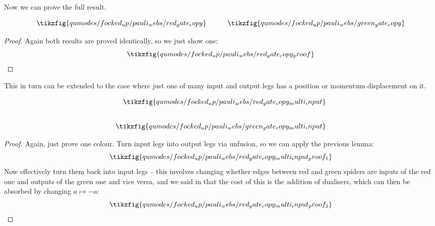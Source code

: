 
Now we can prove the full result.

\begin{proposition}\label{prop:gate_copy}
\begin{equation*}\label{eq:gate_copy}
    \tikzfig{qumodes/focked_up/pauli_webs/red_gate_copy}
    \qqquad
    \tikzfig{qumodes/focked_up/pauli_webs/green_gate_copy}
\end{equation*}
\begin{proof}
    Again both results are proved identically, so we just show one:
    \begin{equation*}\label{eq:red_gate_copy_proof}
    \tikzfig{qumodes/focked_up/pauli_webs/red_gate_copy_proof}
    \end{equation*}
\end{proof}
\end{proposition}

This in turn can be extended to the case where just one of many input and output legs has a position or momentum displacement on it.
\begin{lemma}\label{lem:red_gate_copy_multi_inputs}
    \begin{equation}\label{eq:red_gate_copy_multi_inputs}
        \begin{aligned}
            \tikzfig{qumodes/focked_up/pauli_webs/red_gate_copy_multi_input}
            \\[20pt]
            \tikzfig{qumodes/focked_up/pauli_webs/green_gate_copy_multi_input}
        \end{aligned}
    \end{equation}
    \begin{proof}
        Again, just prove one colour.
        Turn input legs into output legs via unfusion, so we can apply the previous lemma:
        \begin{equation}
            \tikzfig{qumodes/focked_up/pauli_webs/red_gate_copy_multi_input_proof_1}
        \end{equation}
        Now effectively turn them back into input legs -- this involves changing whether edges between red and green spiders are inputs of the red one and outputs of the green one and vice versa, and we said in  that the cost of this is the addition of dualisers, which can then be absorbed by changing $a \mapsto -a$:
        \begin{equation}
            \tikzfig{qumodes/focked_up/pauli_webs/red_gate_copy_multi_input_proof_2}
        \end{equation}
    \end{proof}
\end{lemma}

